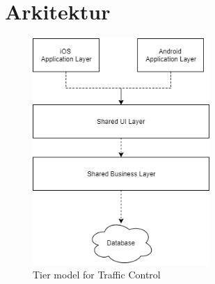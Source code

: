\chapter{Arkitektur} 


\begin{figure}[htbp] %
	\centering
	\includegraphics[width=0.6\textwidth]{../Dokumentation/Arkitektur/SystemArkitektur.png}
	\caption{Tier model for Traffic Control}
	\label{fig:TierModel}
\end{figure}
\clearpage



